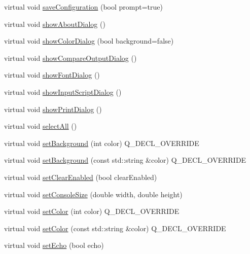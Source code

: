 \begin{DoxyCompactItemize}
virtual void \mbox{\hyperlink{classGConsoleWindow_a55de4223be76e76aa61491f2e33dd316}{save\+Configuration}} (bool prompt=true)
\item 
virtual void \mbox{\hyperlink{classGConsoleWindow_ac63a90a3b880d5e9cfd47b54b336be8b}{show\+About\+Dialog}} ()
\item 
virtual void \mbox{\hyperlink{classGConsoleWindow_a5507e237906548f607651c9228855129}{show\+Color\+Dialog}} (bool background=false)
\item 
virtual void \mbox{\hyperlink{classGConsoleWindow_afdd88a9146410f87df173018316ecb79}{show\+Compare\+Output\+Dialog}} ()
\item 
virtual void \mbox{\hyperlink{classGConsoleWindow_a6d88cc93c7dccdcf073f8044532e31f3}{show\+Font\+Dialog}} ()
\item 
virtual void \mbox{\hyperlink{classGConsoleWindow_a2e0fe7d143ab14f8fca7111bd61234c5}{show\+Input\+Script\+Dialog}} ()
\item 
virtual void \mbox{\hyperlink{classGConsoleWindow_afd39df06d7cf4801931648c52cd03b03}{show\+Print\+Dialog}} ()
\item 
virtual void \mbox{\hyperlink{classGConsoleWindow_ab6658ed404200bd7aaca5629db064645}{select\+All}} ()
\item 
virtual void \mbox{\hyperlink{classGConsoleWindow_a427fefbbc34e39e5df27a807da488e0d}{set\+Background}} (int color) Q\+\_\+\+D\+E\+C\+L\+\_\+\+O\+V\+E\+R\+R\+I\+DE
\item 
virtual void \mbox{\hyperlink{classGConsoleWindow_a222fcfb542aa6094c7e0de671bd69627}{set\+Background}} (const std\+::string \&color) Q\+\_\+\+D\+E\+C\+L\+\_\+\+O\+V\+E\+R\+R\+I\+DE
\item 
virtual void \mbox{\hyperlink{classGConsoleWindow_a9d6a359503a0bc164ae8ea1389cff050}{set\+Clear\+Enabled}} (bool clear\+Enabled)
\item 
virtual void \mbox{\hyperlink{classGConsoleWindow_a85945ff6dea7bf9436a0f19b150e3d50}{set\+Console\+Size}} (double width, double height)
\item 
virtual void \mbox{\hyperlink{classGConsoleWindow_a292eb0ce61f3fdb1d28b17e1e34928f7}{set\+Color}} (int color) Q\+\_\+\+D\+E\+C\+L\+\_\+\+O\+V\+E\+R\+R\+I\+DE
\item 
virtual void \mbox{\hyperlink{classGConsoleWindow_ad148324da1b0340e84e24dffa577ffca}{set\+Color}} (const std\+::string \&color) Q\+\_\+\+D\+E\+C\+L\+\_\+\+O\+V\+E\+R\+R\+I\+DE
\item 
virtual void \mbox{\hyperlink{classGConsoleWindow_ac46d66f785b8f79bd2b0a14a75772a7c}{set\+Echo}} (bool echo)

\end{DoxyCompactItemize}
